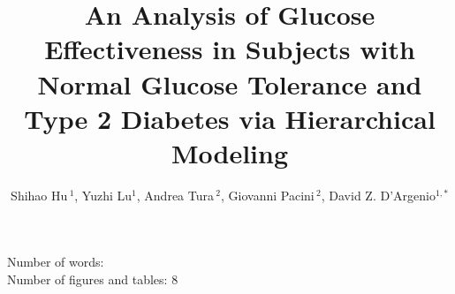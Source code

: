 \documentclass[utf8]{frontiersSCNS} %
\def\firstAuthorLast{Hu {et~al.}} %
\def\Authors{Shihao Hu\,$^{1}$, Yuzhi Lu$^{1}$, Andrea Tura\,$^{2}$, Giovanni Pacini\,$^{2}$, David Z. D’Argenio$^{1,*}$}
\begin{document}
\onecolumn
{}

\title[Hierarchical Modeling  of Glucose Effectiveness]{An Analysis of Glucose Effectiveness in Subjects with Normal Glucose Tolerance and Type 2 Diabetes via Hierarchical Modeling} 

\author[\firstAuthorLast ]{\Authors} %
\address{} %
\correspondance{} %

\extraAuth{}%

\maketitle
Number of words:  \\
Number of figures and tables: 8
\end{document}
